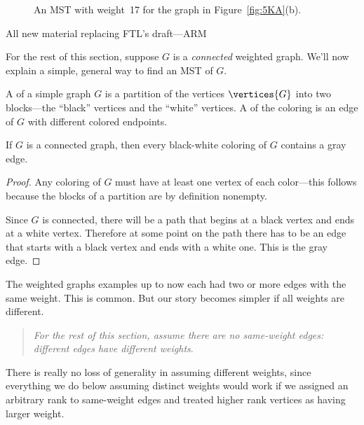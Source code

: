 \begin{figure}
\caption{An MST with weight~17 for the graph in
  Figure~\ref{fig:5KA}(b).}
\label{fig:5KB}
\end{figure}

\begin{editingnotes}
All new material replacing FTL's draft---ARM
\end{editingnotes}

For the rest of this section, suppose $G$ is a \emph{connected}
weighted graph.  We'll now explain a simple, general way to find an
MST of $G$.

\begin{definition}
A  of a simple
graph $G$ is a partition of the vertices $\vertices{G}$ into two
blocks---the ``black'' vertices and the ``white'' vertices.  A
 of the coloring is an edge of $G$ with different
colored endpoints.
\end{definition}

\begin{lemma}\label{lem:enough-gray}
If $G$ is a connected graph, then every black-white coloring of $G$
contains a gray edge.
\end{lemma}

\begin{proof}
Any coloring of $G$ must have at least one vertex of each color---this
follows because the blocks of a partition are by definition nonempty.

Since $G$ is connected, there will be a path that begins at a black
vertex and ends at a white vertex.  Therefore at some point on the
path there has to be an edge that starts with a black vertex and ends
with a white one.  This is the gray edge.
\end{proof}

The weighted graphs examples up to now each had two or more edges with
the same weight.  This is common.  But our story becomes simpler if
all weights are different.

\begin{quote}
\emph{For the rest of this section, assume there are no same-weight
  edges: different edges have different weights}.
\end{quote}

There is really no loss of generality in assuming different weights,
since everything we do below assuming distinct weights would work if
we assigned an arbitrary rank to same-weight edges and treated higher
rank vertices as having larger weight.

